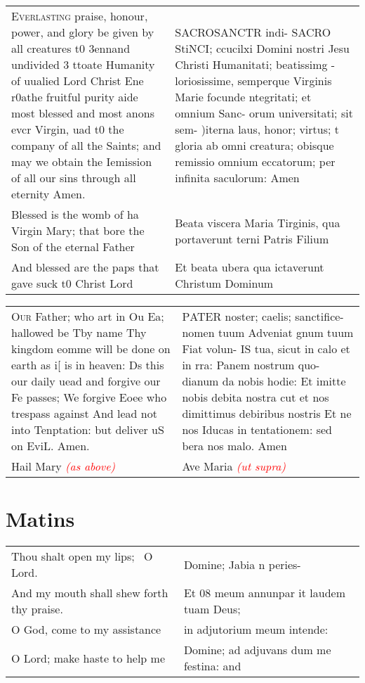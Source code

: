 \documentclass{article}
\makeatletter
\DeclareRobustCommand{\versicle}{\textcolor{red}{\vers@resp{-0.1em}{V. }}}
\DeclareRobustCommand{\response}{\textcolor{red}{\vers@resp{0pt}{R. }}}
\newcommand{\vers@resp@sym}{\raisebox{0.2ex}{\rotatebox[origin=c]{-20}{$\m@th\rceil$}}}
\newcommand{\vers@resp}[2]{%
  {\ooalign{\hidewidth\kern#1\vers@resp@sym\hidewidth\cr#2\cr}}%
}
\newcommand{\primus}[2]{\Romantik\lettrine{#1}\rmfamily\normalfont\textsc{#2}}
\newcommand{\nota}[1]{\textit{\textcolor{red}{#1}}}
\newcommand{\cruc}{\textcolor{red}{\tiny\CrossMaltese \ }}
\makeatother
\begin{document}
\begin{multicols*}{3}
\begin{center}
	\begin{tabular}{ m{1.75in} | m{1.75in} }
		\primus{E}{verlasting} praise, honour, power, and glory be given by all creatures t0 3ennand undivided 3 ttoate Humanity of  uualied Lord Christ Ene r0athe fruitful purity aide most blessed and most anons evcr Virgin, uad t0 the company of all the Saints; and may we obtain the Iemission of all our sins through all eternity Amen. & \primus{S}{ACROSANCTR} indi- SACRO StiNCI; ccucilxi Domini nostri Jesu Christi Humanitati; beatissimg -loriosissime, semperque Virginis Marie focunde ntegritati; et omnium Sanc- orum universitati; sit sem- )iterna   laus, honor; virtus; t gloria ab omni creatura; obisque remissio omnium eccatorum; per infinita saculorum: Amen \\
		\versicle Blessed is the womb of ha Virgin Mary; that bore the Son of the eternal Father & \versicle Beata viscera Maria Tirginis, qua portaverunt terni Patris Filium \\
		\response And blessed are the paps that gave suck t0 Christ  Lord & \response Et beata ubera qua ictaverunt Christum Dominum
	\end{tabular}
\end{center}

\begin{center}
	\begin{tabular}{ m{1.75in} | m{1.75in} }
		\primus{O}{ur} Father; who art in Ou Ea; hallowed be Tby name Thy kingdom eomme will be done on earth as i[ is in heaven: Ds this our daily uead and forgive our Fe passes; We forgive Eoee who trespass against  And lead not into Tenptation: but deliver uS on EviL. Amen. & \primus{P}{ATER} noster; caelis; sanctifice- nomen tuum  Adveniat gnum tuum Fiat  volun- IS tua, sicut in calo et in rra: Panem nostrum quo- dianum da nobis hodie: Et imitte nobis debita nostra cut et nos dimittimus debiribus nostris Et ne nos Iducas in tentationem: sed bera nos malo. Amen \\
	Hail Mary \nota{(as above)} & Ave Maria \nota{(ut supra)}

	\end{tabular}
\end{center}

	\section{Matins}

\begin{center}
	\begin{tabular}{ m{1.75in} | m{1.75in} }
\versicle Thou shalt open my lips; \cruc O Lord. & \versicle Domine; Jabia n peries- \\
\response And my mouth shall shew forth thy praise. & \response Et 08 meum annunpar it laudem tuam Deus; \\
\versicle O God, come to my assistance & \versicle in adjutorium meum intende: \\
\response O Lord; make haste to help me & \response Domine; ad adjuvans dum me festina: and


\end{tabular}
\end{center}
\end{multicols*}
\end{document}
